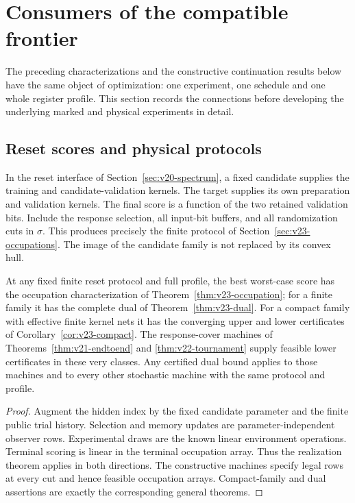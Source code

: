 \section{Consumers of the compatible frontier}
\label{sec:v23-consumers}
The preceding characterizations and the constructive continuation
results below have the same object of optimization: one experiment,
one schedule and one whole register profile. This section records the
connections before developing the underlying marked and physical
experiments in detail.

\subsection{Reset scores and physical protocols}
In the reset interface of Section~\ref{sec:v20-spectrum}, a fixed
candidate supplies the training and candidate-validation kernels. The
target supplies its own preparation and validation kernels. The final
score is a function of the two retained validation bits. Include the
response selection, all input-bit buffers, and all randomization cuts
in $\sigma$. This produces precisely the finite protocol of
Section~\ref{sec:v23-occupations}. The image of the candidate family
is not replaced by its convex hull.

\begin{corollary}
\label{cor:v23-reset-consumer}
At any fixed finite reset protocol and full profile, the best worst-case
score has the occupation characterization of
Theorem~\ref{thm:v23-occupation}; for a finite family it has the complete
dual of Theorem~\ref{thm:v23-dual}. For a compact family with effective
finite kernel nets it has the converging upper and lower certificates
of Corollary~\ref{cor:v23-compact}. The response-cover machines of
Theorems~\ref{thm:v21-endtoend} and \ref{thm:v22-tournament} supply
feasible lower certificates in these very classes. Any certified dual
bound applies to those machines and to every other stochastic machine
with the same protocol and profile.
\end{corollary}
\begin{proof}
Augment the hidden index by the fixed candidate parameter and the
finite public trial history. Selection and memory updates are
parameter-independent observer rows. Experimental draws are the known
linear environment operations. Terminal scoring is linear in the
terminal occupation array. Thus the realization theorem applies in
both directions. The constructive machines specify legal rows at
every cut and hence feasible occupation arrays. Compact-family and
dual assertions are exactly the corresponding general theorems.
\end{proof}


